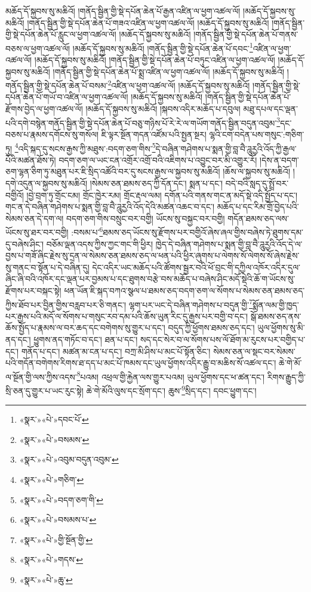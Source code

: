 མཆོད་དོ་སྐྱབས་སུ་མཆིའོ། །གནོད་སྦྱིན་གྱི་སྡེ་དཔོན་ཆེན་པོ་རྒྱན་འཛིན་ལ་ཕྱག་འཚལ་ལོ། །མཆོད་དོ་སྐྱབས་སུ་མཆིའོ། །གནོད་སྦྱིན་གྱི་སྡེ་དཔོན་ཆེན་པོ་གཟའ་འཛིན་ལ་ཕྱག་འཚལ་ལོ། །མཆོད་དོ་སྐྱབས་སུ་མཆིའོ། །གནོད་སྦྱིན་གྱི་སྡེ་དཔོན་ཆེན་པོ་རླུང་ལ་ཕྱག་འཚལ་ལོ། །མཆོད་དོ་སྐྱབས་སུ་མཆིའོ། །གནོད་སྦྱིན་གྱི་སྡེ་དཔོན་ཆེན་པོ་གནས་བཅས་ལ་ཕྱག་འཚལ་ལོ། །མཆོད་དོ་སྐྱབས་སུ་མཆིའོ། །གནོད་སྦྱིན་གྱི་སྡེ་དཔོན་ཆེན་པོ་དབང་\footnote{«སྣར་»«པེ་»དབང་པོ་}འཛིན་ལ་ཕྱག་འཚལ་ལོ། །མཆོད་དོ་སྐྱབས་སུ་མཆིའོ། །གནོད་སྦྱིན་གྱི་སྡེ་དཔོན་ཆེན་པོ་བཏུང་འཛིན་ལ་ཕྱག་འཚལ་ལོ། །མཆོད་དོ་སྐྱབས་སུ་མཆིའོ། །གནོད་སྦྱིན་གྱི་སྡེ་དཔོན་ཆེན་པོ་སྨྲ་འཛིན་ལ་ཕྱག་འཚལ་ལོ། །མཆོད་དོ་སྐྱབས་སུ་མཆིའོ། །གནོད་སྦྱིན་གྱི་སྡེ་དཔོན་ཆེན་པོ་བསམ་\footnote{«སྣར་»«པེ་»བསམས་}འཛིན་ལ་ཕྱག་འཚལ་ལོ། །མཆོད་དོ་སྐྱབས་སུ་མཆིའོ། །གནོད་སྦྱིན་གྱི་སྡེ་དཔོན་ཆེན་པོ་གཡོ་བ་འཛིན་ལ་ཕྱག་འཚལ་ལོ། །མཆོད་དོ་སྐྱབས་སུ་མཆིའོ། །གནོད་སྦྱིན་གྱི་སྡེ་དཔོན་ཆེན་པོ་རྫོགས་བྱེད་ལ་ཕྱག་འཚལ་ལོ། །མཆོད་དོ་སྐྱབས་སུ་མཆིའོ། །སྐབས་འདིར་མཆོད་པ་དབུལ། མཐུ་དཔལ་དང་ལྡན་པའི་དགེ་བསྙེན་གནོད་སྦྱིན་གྱི་སྡེ་དཔོན་ཆེན་པོ་བཅུ་གཉིས་པོ་རེ་རེ་ལ་གཡོག་གནོད་སྦྱིན་བདུན་འབུམ་\footnote{«སྣར་»«པེ་»འབུམ་བདུན་འབུམ་}དང་བཅས་པ་རྣམས་དགོངས་སུ་གསོལ། ཇི་ལྟར་སྔོན་གདན་འཛོམ་པའི་སྤྱན་སྔར། ལྷའི་ངག་བདེན་པས་གསུང་:གཅིག་ཏུ། \footnote{«སྣར་»«པེ་»གཅིག་}འདི་སྐད་དུ་སངས་རྒྱས་ཀྱི་མཐུས་:བདག་ཅག་གིས་\footnote{«སྣར་»«པེ་»བདག་ཅག་གི་}དེ་བཞིན་གཤེགས་པ་སྨན་གྱི་བླ་བཻ་ཌཱུརྱའི་འོད་ཀྱི་རྒྱལ་པོའི་མཚན་ཐོས་ཏེ། བདག་ཅག་ལ་ཡང་ངན་འགྲོར་འགྲོ་བའི་འཇིགས་པ་འབྱུང་བར་མི་འགྱུར་རོ། །དེས་ན་བདག་ཅག་ལྷན་ཅིག་ཏུ་མཐུན་པར་ཇི་སྲིད་འཚོའི་བར་དུ་སངས་རྒྱས་ལ་སྐྱབས་སུ་མཆིའོ། །ཆོས་ལ་སྐྱབས་སུ་མཆིའོ། །དགེ་འདུན་ལ་སྐྱབས་སུ་མཆིའོ། །སེམས་ཅན་ཐམས་ཅད་ཀྱི་དོན་དང་། སྨན་པ་དང་། བདེ་བའི་སླད་དུ་སྤྲོ་བར་བགྱིའོ། །བྱེ་བྲག་ཏུ་གྲོང་ངམ། གྲོང་ཁྱེར་རམ། གྲོང་རྡལ་ལམ། དགོན་པའི་གནས་གང་ན་མདོ་སྡེ་འདི་སྤྱོད་པ་དང་། གང་ན་དེ་བཞིན་གཤེགས་པ་སྨན་གྱི་བླ་བཻ་ཌཱུརྱའི་འོད་དེའི་མཚན་འཆང་བ་དང་། མཆོད་པ་དང་རིམ་གྲོ་བྱེད་པའི་སེམས་ཅན་དེ་དག་ལ། བདག་ཅག་གིས་བསྲུང་བར་བགྱི། ཡོངས་སུ་བསྐྱང་བར་བགྱི། གདོན་ཐམས་ཅད་ལས་ཡོངས་སུ་ཐར་བར་བགྱི། :བསམ་པ་\footnote{«སྣར་»«པེ་»བསམས་པ་}ཐམས་ཅད་ཡོངས་སུ་རྫོགས་པར་བགྱིའོ་ཞེས་ཞལ་གྱིས་བཞེས་ཏེ་ཐུགས་དམ་དུ་བཞེས་ཤིང་། བཅོམ་ལྡན་འདས་ཀྱིས་ཀྱང་གང་གི་ཕྱིར། ཁྱེད་དེ་བཞིན་གཤེགས་པ་སྨན་གྱི་བླ་བཻ་ཌཱུརྱའི་འོད་དེ་ལ་བྱས་པ་གཟོ་ཞིང་རྗེས་སུ་དྲན་ལ་སེམས་ཅན་ཐམས་ཅད་ལ་ཕན་པའི་ཕྱིར་ཞུགས་པ་ལེགས་སོ་ལེགས་སོ་ཞེས་རྗེས་སུ་གནང་བ་སྟོན་པ་དེ་བཞིན་དུ། དེང་འདིར་ཡང་མཆོད་པའི་ཚོགས་སྦྱར་བའི་ཕོ་བྲང་གི་དཀྱིལ་འཁོར་འདིར་དུལ་ཞིང་ཞི་བའི་འཁོར་དང་ལྡན་པར་བྱམས་པ་དང་ཐུགས་བརྩེ་བས་མཆོད་པ་བཞེས་ཤིང་མདོ་སྡེའི་ཆོ་ག་ཡོངས་སུ་རྫོགས་པར་བསྐང་སྟེ། ཕན་ཡོན་ཇི་སྐད་བཀའ་སྩལ་པ་ཐམས་ཅད་བདག་ཅག་ལ་སོགས་པ་སེམས་ཅན་ཐམས་ཅད་ཀྱིས་ཐོབ་པར་བྱིན་གྱིས་བརླབ་པར་ཅི་གནང་། ལྷག་པར་ཡང་དེ་བཞིན་གཤེགས་པ་བདུན་གྱི་\footnote{«སྣར་»«པེ་»གྱི་སྔོན་གྱི་}སྨོན་ལམ་གྱི་ཁྱད་པར་རྒྱས་པའི་མདོ་ལ་སོགས་པ་གསུང་རབ་དམ་པའི་ཆོས་ཡུན་རིང་དུ་རྒྱས་པར་བགྱི་བ་དང་། སྒོ་ཐམས་ཅད་ནས་ཆོས་སྤྱོད་པ་རྣམས་ལ་བར་ཆད་དང་བགེགས་སུ་གྱུར་པ་དང་། བདུད་ཀྱི་ཕྱོགས་ཐམས་ཅད་དང་། ཡུལ་ཕྱོགས་སུ་མི་ནད་དང་། ཕྱུགས་ནད་གཏོང་བ་དང་། ཐན་པ་དང་། སད་དང་སེར་བ་ལ་སོགས་པས་ལོ་ཐོག་མ་རུངས་པར་བགྱིད་པ་དང་། གནོད་པ་དང་། མཚན་མ་ངན་པ་དང་། བཀྲ་མི་ཤིས་པ་མང་པོ་སྟོན་ཅིང་། སེམས་ཅན་ལ་སྡང་བར་སེམས་པའི་གདོན་བགེགས་རིགས་ཐ་དད་པ་མང་པོ་ཁམས་དང་ཡུལ་ཕྱོགས་འདིར་རྒྱུ་བ་མཆིས་སོ་འཚལ་དང་། ཆེ་གེ་མོ་ལ་སྔོན་གྱི་ལས་ཀྱིས་འདས་\footnote{«སྣར་»«པེ་»གདས་}པའམ། འཕྲལ་གྱི་རྐྱེན་ལས་གྱུར་པའམ། ཡུལ་ཕྱོགས་དང་ཕ་ཚན་དང་། རིགས་རྒྱུད་ཀྱི་སྲི་ཅན་དུ་གྱུར་པ་ཡང་རུང་སྟེ། ཆེ་གེ་མོའི་ལུས་དང་སྲོག་དང་། ཆུས་\footnote{«སྣར་»«པེ་»ཆུ་}སྲིད་དང་། དབང་ཕྱུག་དང་། 